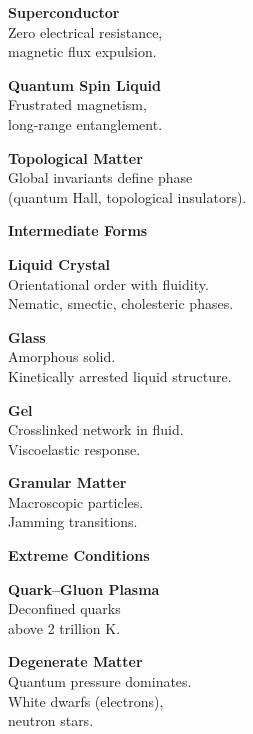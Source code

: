 \begin{tcolorbox}
\begin{multicols}{2}
\textbf{Superconductor}\\
{\footnotesize Zero electrical resistance,\\magnetic flux expulsion.}\vspace{6pt}

\textbf{Quantum Spin Liquid}\\
{\footnotesize Frustrated magnetism,\\long-range entanglement.}\vspace{6pt}

\textbf{Topological Matter}\\
{\footnotesize Global invariants define phase\\(quantum Hall, topological insulators).}

\columnbreak

\colorbox{blue!15}{\textbf{\large Intermediate Forms}}\vspace{3pt}

\textbf{Liquid Crystal}\\
{\footnotesize Orientational order with fluidity.\\Nematic, smectic, cholesteric phases.}\vspace{6pt}

\textbf{Glass}\\
{\footnotesize Amorphous solid.\\Kinetically arrested liquid structure.}\vspace{6pt}

\textbf{Gel}\\
{\footnotesize Crosslinked network in fluid.\\Viscoelastic response.}\vspace{6pt}

\textbf{Granular Matter}\\
{\footnotesize Macroscopic particles.\\Jamming transitions.}\vspace{12pt}

\colorbox{blue!15}{\textbf{\large Extreme Conditions}}\vspace{3pt}

\textbf{Quark–Gluon Plasma}\\
{\footnotesize Deconfined quarks\\above 2 trillion K.}\vspace{6pt}

\textbf{Degenerate Matter}\\
{\footnotesize Quantum pressure dominates.\\White dwarfs (electrons),\\neutron stars.}\vspace{6pt}


\end{multicols}
\end{tcolorbox}
